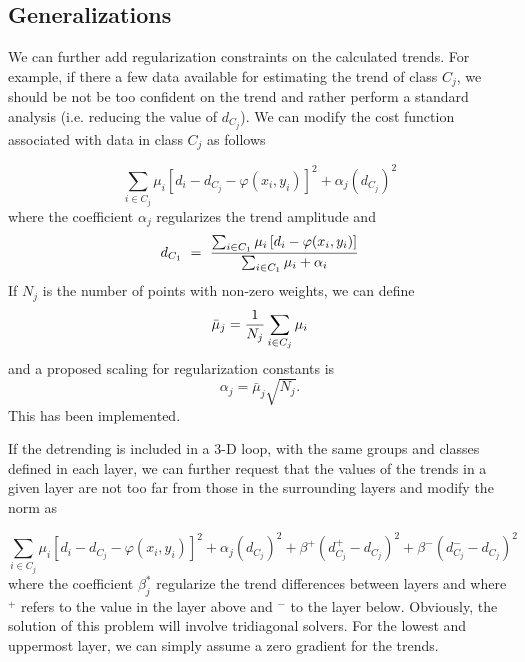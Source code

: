 \subsection{Generalizations}

We can further add regularization constraints on the calculated trends. For example, if there a few data available for estimating the trend of class $C_j$, we
should be not be too confident on the trend and rather perform a standard analysis (i.e. reducing the value of $d_{C_j}$). We can modify the
cost function associated with data in class $C_j$ as follows

\begin{equation}
\sum_{i\in C_j} \mu_i \left[ d_i -d_{C_j}- \varphi(x_i,y_i) \right]^2 + \alpha_j (d_{C_j})^2
\end{equation}
where the coefficient $\alpha_j$ regularizes the trend amplitude and
\begin{equation}
d_{C_1} ~=~{ \sum_{i\in C_1} \mu_i \left[ d_i - \varphi(x_i,y_i) \right] \over \sum_{i\in C_1} \mu_i + \alpha_i}
\end{equation}
If $N_j$ is the number of points with non-zero weights, we can define
\begin{equation}
\bar{\mu}_j = {1 \over N_j} \sum_{i\in C_j} \mu_i
\end{equation}
and a proposed scaling for regularization constants is
\begin{equation}
\alpha_j = \bar{\mu}_j \sqrt{N_j}.
\end{equation}
This has been implemented.



If the detrending is included in a 3-D loop, with the same groups and classes defined in each layer, we can further request that the values of the trends in a given layer are not too far from those in the surrounding layers and modify the norm as

\begin{equation}
\sum_{i\in C_j} \mu_i \left[ d_i -d_{C_j}- \varphi(x_i,y_i) \right]^2 + \alpha_j (d_{C_j})^2 + \beta^+ (d^+_{C_j}- d_{C_j})^2 + \beta^- (d^-_{C_j}- d_{C_j})^2
\end{equation}
where the coefficient $\beta_j^*$ regularize the trend differences between layers and where $^+$ refers to the value in the layer above and $^-$ to the layer below. Obviously, the solution of this problem will involve tridiagonal solvers. For the lowest and uppermost layer, we can simply assume a zero gradient for the trends.

